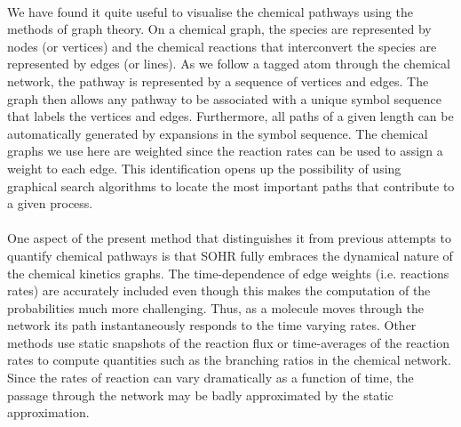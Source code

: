 \paragraph{}
We have found it quite useful to visualise the chemical pathways using the methods
of graph theory. On a chemical graph, the species are represented by nodes (or vertices)
and the chemical reactions that interconvert the species are represented by edges (or
lines).\cite{ch1_IRPC_27_christiansen1953elucidation,ch1_IRPC_28_hansen1988chemical,ch1_IRPC_29_balaban1976chemical,ch1_IRPC_30_temkin1992application,ch1_IRPC_31_lu2005directed} As we follow a tagged atom through the chemical network, the pathway
is represented by a sequence of vertices and edges. The graph then allows any pathway
to be associated with a unique symbol sequence that labels the vertices and edges. Furthermore,
all paths of a given length can be automatically generated by expansions in
the symbol sequence. The chemical graphs we use here are weighted since the reaction
rates can be used to assign a weight to each edge. This identification opens up the possibility
of using graphical search algorithms to locate the most important paths that contribute
to a given process.
\newline
\paragraph{}
One aspect of the present method that distinguishes it from previous attempts to
quantify chemical pathways\cite{ch1_IRPC_20_lehmann2004algorithm,ch1_IRPC_32_chemkin201115112} is that SOHR fully embraces the dynamical nature
of the chemical kinetics graphs. The time-dependence of edge weights (i.e. reactions
rates) are accurately included even though this makes the computation of the probabilities
much more challenging. Thus, as a molecule moves through the network its path
instantaneously responds to the time varying rates. Other methods use static snapshots
of the reaction flux or time-averages of the reaction rates to compute quantities such as
the branching ratios in the chemical network. Since the rates of reaction can vary dramatically
as a function of time, the passage through the network may be badly approximated
by the static approximation.
\newline
